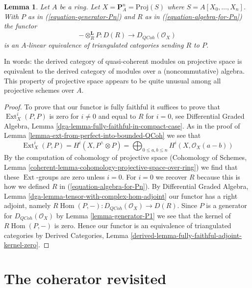 \documentclass{stacks-project}
\newenvironment{reference}{\comment}{\endcomment}
\theoremstyle{plain}
\newtheorem{lemma}[subsection]{Lemma}
\theoremstyle{definition}
\theoremstyle{remark}
\numberwithin{equation}{subsection}
\def\Hom{\mathop{\mathrm{Hom}}\nolimits}
\def\Ext{\mathop{\mathrm{Ext}}\nolimits}
\def\QCoh{\mathit{QCoh}}
\begin{document}
\begin{lemma}
\label{lemma-Pn-module-category}
\begin{reference}
\cite{Beilinson}
\end{reference}
Let $A$ be a ring. Let $X = \mathbf{P}^n_A = \text{Proj}(S)$
where $S = A[X_0, \ldots, X_n]$. With
$P$ as in (\ref{equation-generator-Pn}) and
$R$ as in (\ref{equation-algebra-for-Pn})
the functor
$$
- \otimes_R^\mathbf{L} P : D(R) \longrightarrow D_\QCoh(\mathcal{O}_X)
$$
is an $A$-linear equivalence of triangulated categories sending $R$
to $P$.
\end{lemma}

\noindent
In words: the derived category of quasi-coherent modules on
projective space is equivalent to the derived category of modules
over a (noncommutative) algebra.
This property of projective space appears to be quite unusual among
all projective schemes over $A$.

\begin{proof}
To prove that our functor is fully faithful it suffices to prove
that $\Ext^i_X(P, P)$ is zero for $i \not = 0$ and equal
to $R$ for $i = 0$, see
Differential Graded Algebra, Lemma
\ref{dga-lemma-fully-faithful-in-compact-case}.
As in the proof of
Lemma \ref{lemma-ext-from-perfect-into-bounded-QCoh}
we see that
$$
\Ext^i_X(P, P) = H^i(X, P^\wedge \otimes P) =
\bigoplus\nolimits_{0 \leq a, b \leq n} H^i(X, \mathcal{O}_X(a - b))
$$
By the computation of cohomology of projective space
(Cohomology of Schemes, Lemma
\ref{coherent-lemma-cohomology-projective-space-over-ring})
we find that
these $\Ext$-groups are zero unless $i = 0$.
For $i = 0$ we recover $R$ because this is how we defined $R$
in (\ref{equation-algebra-for-Pn}).
By Differential Graded Algebra, Lemma
\ref{dga-lemma-tensor-with-complex-hom-adjoint}
our functor has a right adjoint, namely
$R\Hom(P, -) : D_\QCoh(\mathcal{O}_X) \to D(R)$.
Since $P$ is a generator for $D_\QCoh(\mathcal{O}_X)$ by
Lemma \ref{lemma-generator-P1}
we see that the kernel of $R\Hom(P, -)$ is zero.
Hence our functor is an equivalence of triangulated
categories by Derived Categories, Lemma
\ref{derived-lemma-fully-faithful-adjoint-kernel-zero}.
\end{proof}






\section{The coherator revisited}
\label{section-better-coherator}
\end{document}
